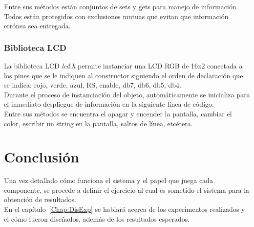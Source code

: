 Entre sus métodos están conjuntos de sets y gets para manejo de información. Todos están protegidos con exclusiones mutuas que evitan que información errónea sea entregada.

\subsubsection{Biblioteca LCD}

La biblioteca LCD \textit{lcd.h} permite instanciar una LCD RGB de 16x2 conectada a los pines que se le indiquen al constructor siguiendo el orden de declaración que se indica: rojo, verde, azul, RS, enable, db7, db6, db5, db4. \\

Durante el proceso de instanciación del objeto, automáticamente se inicializa para el inmediato despliegue de información en  la siguiente línea de código.\\

Entre sus métodos se encuentra el apagar y encender la pantalla, cambiar el color, escribir un string en la pantalla, saltos de línea, etcétera.

\section{Conclusión}

Una vez detallado cómo funciona el sistema y el papel que juega cada componente, se procede a definir el ejercicio al cual es sometido el sistema para la obtención de resultados.\\
 
En el capítulo~\ref{Chap:DisExp} se hablará acerca de los experimentos realizados y el cómo fueron diseñados, además de los resultados esperados.